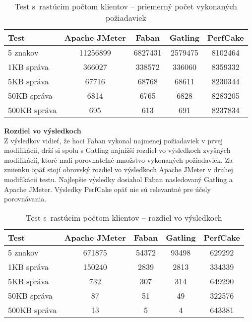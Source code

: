 \documentclass[12pt,oneside,final]{fithesis-utf8}
\begin{document}
\begin{itemize}
\begin{table}[H]
\begin{center}
\begin{tabular}{ | l | c | c | c | c |}
		\hline
		 \textbf{Test} & \textbf{Apache JMeter} & \textbf{Faban} & \textbf{Gatling} & \textbf{PerfCake} \\ \hline
		 5 znakov & 11256899 & 6827431 & 2579475 & 8102464 \\ \hline
 		 1KB správa & 366027 & 338572 & 336060 & 8359332 \\ \hline
 		 5KB správa & 67716 & 68768 & 68611 & 8230344 \\ \hline
 		 50KB správa & 6814 & 6765 & 6828 & 8283205 \\ \hline
		 500KB správa & 695 & 613 & 691 & 8237834 \\ \hline
		 
\end{tabular}
\end{center}
\caption{Test s~rastúcim počtom klientov -- priemerný počet vykonaných požiadaviek}
\end{table}

\textbf{Rozdiel vo výsledkoch}\\
Z výsledkov vidieť, že hoci Faban vykonal najmenej požiadaviek v prvej modifikácii, drží si spolu s Gatling najnižší rozdiel vo výsledkoch zvyšných modifikácií, ktoré mali porovnateľné množstvo vykonaných požiadaviek. Za zmienku opäť stojí obrovský rozdiel vo výsledkoch Apache JMeter v druhej modifikácii testu. Najlepšie výsledky dosiahol Faban nasledovaný Gatling a Apache JMeter. Výsledky PerfCake opäť nie sú relevantné pre účely porovnávania.

\begin{table}[H]
\begin{center}
\begin{tabular}{ | l | c | c | c | c |}
		\hline
		 \textbf{Test} & \textbf{Apache JMeter} & \textbf{Faban} & \textbf{Gatling} & \textbf{PerfCake} \\ \hline
		 5 znakov & 671875 & 54372 & 93498 & 629292 \\ \hline
		 1KB správa & 150240 & 2839 & 2813 & 334339 \\ \hline
		 5KB správa & 732 & 307 & 314 & 649290 \\ \hline
		 50KB správa & 87 & 51 & 49 & 322576 \\ \hline
		 500KB správa & 13 & 5 & 4 & 643381 \\ \hline
		 
\end{tabular}
\end{center}
\caption{Test s~rastúcim počtom klientov -- rozdiel vo výsledkoch}
\end{table}

\end{itemize}
\end{document}
